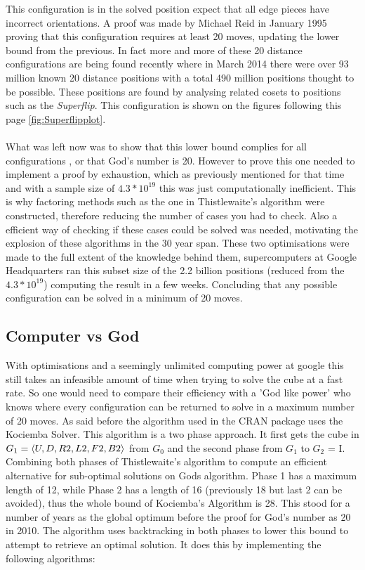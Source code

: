 \documentclass{article}
\DeclarePairedDelimiter{\opair}{\langle}{\rangle}
\newcounter{lem}[section]\setcounter{lem}{0}
\begin{document}
This configuration is in the solved position expect that all edge pieces have incorrect orientations. A proof was made by Michael Reid in January 1995 proving that this configuration requires at least 20 moves, updating the lower bound from the previous. In fact more and more of these 20 distance configurations are being found recently where in March 2014 there were over 93 million known 20 distance positions with a total 490 million positions thought to be possible. These positions are found by analysing related cosets to positions such as the \textit{Superflip}\cite{20}. This configuration is shown on the figures following this page \ref{fig:Superflipplot}.
\paragraph*{}
What was left now was to show that this lower bound complies for all configurations , or that God's number is 20\cite{God}.
However to prove this one needed to implement a proof by exhaustion, which as previously mentioned for that time and with a sample size of $4.3 * 10^{19}$ this was just computationally inefficient. This is why factoring methods such as the one in Thistlewaite's algorithm were constructed, therefore reducing the number of cases you had to check. Also a efficient way of checking if these cases could be solved was needed, motivating the explosion of these algorithms in the 30 year span.
These two optimisations were made to the full extent of the knowledge behind them, supercomputers at Google Headquarters ran this subset size of the 2.2 billion positions (reduced from the $4.3*10^{19}$) computing the result in a few weeks. Concluding that any possible configuration can be solved in a minimum of 20 moves. 
\newpage
\subsection{Computer vs God}

With optimisations and a seemingly unlimited computing power at google this still takes an infeasible amount of time when trying to solve the cube at a fast rate. So one would need to compare their efficiency with a 'God like power' who knows where every configuration can be returned to solve in a maximum number of 20 moves. As said before the algorithm used in the CRAN package uses the Kociemba Solver. This algorithm is a two phase approach. It first gets the cube in  $G_1 = \opair{U,D,R2,L2,F2,B2}$ from  $G_0$ and the second phase from $G_1$ to $G_2$ = I.  Combining both phases of Thistlewaite's algorithm to compute an efficient alternative for sub-optimal solutions on Gods algorithm. Phase 1 has a maximum length of 12, while Phase 2 has a length of 16 (previously 18 but last 2 can be avoided), thus the whole bound of Kociemba's Algorithm is 28. This stood for a number of years as the global optimum before the proof for God's number as 20 in 2010\cite{Kociemba}. The algorithm uses backtracking in both phases to lower this bound to attempt to retrieve an optimal solution. It does this by implementing the following algorithms:
\end{document}
